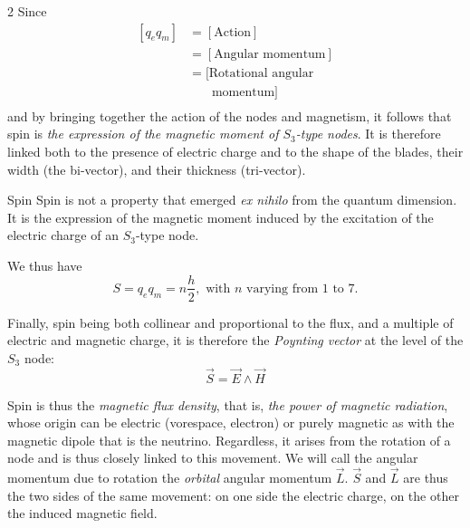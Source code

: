 	\begin{multicols}{2}
	Since
	\begin{equation*}
		\begin{split}
			[q_e q_m] &= [ \text{Action} ]                         \\
			&= [\text{Angular momentum}]                 \\
			&= [\text{Rotational angular}              \\
			&\phantom{= [} \ \text{momentum}] \\
		\end{split}
	\end{equation*}
	and by bringing together the action of the nodes and magnetism, it follows that spin is \textit{the expression of the magnetic moment of $S_3$-type nodes}. It is therefore linked both to the presence of electric charge and to the shape of the blades, their width (the bi-vector), and their thickness (tri-vector).
	
	
	\begin{mybox}[breakable,colback=blue!10, colbacktitle=pkcolor]{Spin}
		Spin is not a property that emerged \textit{ex nihilo} from the quantum dimension. It is the expression of the magnetic moment induced by the excitation of the electric charge of an $S_3$-type node.
	\end{mybox}
	
	We thus have
	\begin{equation*}
		S = q_e q_m = n \frac{h}{2}, \text{ with } n \text{ varying from 1 to 7.} 
	\end{equation*}
	
	Finally, spin being both collinear and proportional to the flux, and a multiple of electric and magnetic charge, it is therefore the \textit{Poynting vector} at the level of the $S_3$ node:
	\begin{equation*}
		\vec{S} = \vec{E} \wedge \vec{H} 
	\end{equation*}
	
	Spin is thus the \textit{magnetic flux density}, that is, \textit{the power of magnetic radiation}, whose origin can be electric (vorespace, electron) or purely magnetic as with the magnetic dipole that is the neutrino. Regardless, it arises from the rotation of a node and is thus closely linked to this movement. We will call the angular momentum due to rotation the \textit{orbital} angular momentum $\vec{L}$. $\vec{S}$ and $\vec{L}$ are thus the two sides of the same movement: on one side the electric charge, on the other the induced magnetic field.
	

\end{multicols}
